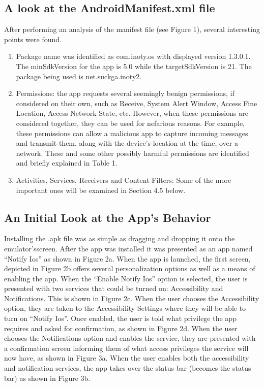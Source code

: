 \documentclass[conference]{IEEEtran}
\begin{document}
\subsection{A look at the AndroidManifest.xml file}
After performing an analysis of the manifest file (see Figure 1), several interesting points were found.
\begin{enumerate}
    \item Package name was identified as com.inoty.os with displayed version 1.3.0.1. The minSdkVersion for the app is 5.0 while the targetSdkVersion is 21. The package being used is net.suckga.inoty2.
    \item Permissions: the app requests several seemingly benign permissions, if considered on their own, such as Receive, System Alert Window, Access Fine Location, Access Network State, etc. However, when these permissions are considered together, they can be used for nefarious reasons. For example, these permissions can allow a malicious app to capture incoming messages and transmit them, along with the device’s location at the time, over a network. These and some other possibly harmful permissions are identified and briefly explained in Table 1.
    \item Activities, Services, Receivers and Content-Filters: Some of the more important ones will be examined in Section 4.5 below.
\end{enumerate}
\subsection{An Initial Look at the App’s Behavior}
Installing the .apk file was as simple as dragging and dropping it onto the emulator’sscreen. After the app was installed it was presented as an app named “Notify Ios” as shown in Figure 2a. When the app is launched, the first screen, depicted in Figure 2b offers several personalization options as well as a means of enabling the app. When the “Enable Notify Ios” option is selected, the user is presented with two services that could be turned on: Accessibility and Notifications. This is shown in Figure 2c. When the user chooses the Accessibility option, they are taken to the Accessibility Settings where they will be able to turn on “Notify Ios”. Once enabled, the user is told what privilege the app requires and asked for confirmation, as shown in Figure 2d. When the user chooses the Notifications option and enables the service, they are presented with a confirmation screen informing them of what access privileges the service will now have, as shown in Figure 3a. When the user enables both the accessibility and notification services, the app takes over the status bar (becomes the status bar) as shown in Figure 3b.
\end{document}
